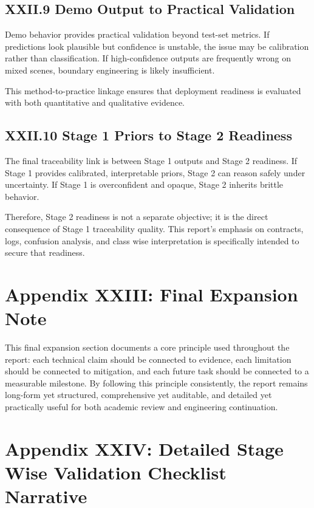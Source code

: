 \subsection*{XXII.9 Demo Output to Practical Validation}
Demo behavior provides practical validation beyond test-set metrics. If predictions look plausible but confidence is unstable, the issue may be calibration rather than classification. If high-confidence outputs are frequently wrong on mixed scenes, boundary engineering is likely insufficient.

This method-to-practice linkage ensures that deployment readiness is evaluated with both quantitative and qualitative evidence.

\subsection*{XXII.10 Stage 1 Priors to Stage 2 Readiness}
The final traceability link is between Stage 1 outputs and Stage 2 readiness. If Stage 1 provides calibrated, interpretable priors, Stage 2 can reason safely under uncertainty. If Stage 1 is overconfident and opaque, Stage 2 inherits brittle behavior.

Therefore, Stage 2 readiness is not a separate objective; it is the direct consequence of Stage 1 traceability quality. This report's emphasis on contracts, logs, confusion analysis, and class wise interpretation is specifically intended to secure that readiness.

\section*{Appendix XXIII: Final Expansion Note}

This final expansion section documents a core principle used throughout the report: each technical claim should be connected to evidence, each limitation should be connected to mitigation, and each future task should be connected to a measurable milestone. By following this principle consistently, the report remains long-form yet structured, comprehensive yet auditable, and detailed yet practically useful for both academic review and engineering continuation.

\section*{Appendix XXIV: Detailed Stage Wise Validation Checklist Narrative}

